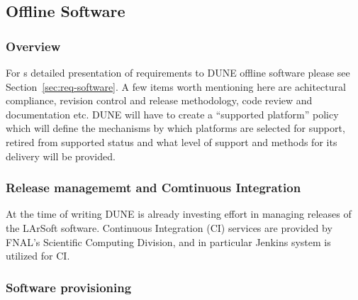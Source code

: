 \subsection{Offline Software}
\subsubsection{Overview}

For s detailed presentation of requirements to DUNE offline software please see Section~\ref{sec:req-software}.
A few items worth mentioning here are achitectural compliance, revision control and release methodology, code review and documentation etc.
DUNE will have to create a ``supported platform'' policy which will define the mechanisms by which platforms are selected for support, retired from
supported status and what level of support and methods for its delivery will be provided.

\subsubsection{Release managememt and Comtinuous Integration}
At the time of writing DUNE is already investing effort in managing releases of the LArSoft software. Continuous Integration (CI) services are provided
by FNAL's Scientific Computing Division, and in particular Jenkins \cite{jenkins} system is utilized for CI.

\subsubsection{Software provisioning}
